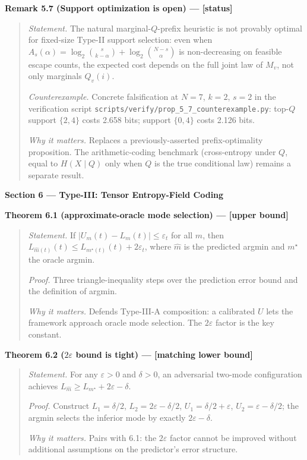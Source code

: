 \documentclass[
]{article}
\begin{document}
\textbf{Remark 5.7 (Support optimization is open) --- {[}status{]}}

\begin{quote}
\emph{Statement.} The natural marginal-$Q$-prefix heuristic is not
provably optimal for fixed-size Type-II support selection: even when
$A_s(\alpha) = \log_2 \binom{s}{k - \alpha} + \log_2 \binom{N - s}{\alpha}$
is non-decreasing on feasible escape counts, the expected cost depends
on the full joint law of $M_v$, not only marginals $Q_v(i)$.

\emph{Counterexample.} Concrete falsification at $N = 7$, $k = 2$,
$s = 2$ in the verification script
\texttt{scripts/verify/prop\_5\_7\_counterexample.py}: top-$Q$ support
$\{2,4\}$ costs 2.658 bits; support $\{0,4\}$ costs 2.126 bits.

\emph{Why it matters.} Replaces a previously-asserted prefix-optimality
proposition. The arithmetic-coding benchmark (cross-entropy under $Q$,
equal to $H(X \mid Q)$ only when $Q$ is the true conditional law)
remains a separate result.
\end{quote}

\textbf{Section 6 --- Type-III: Tensor Entropy-Field Coding}

\textbf{Theorem 6.1 (approximate-oracle mode selection) --- {[}upper
bound{]}}

\begin{quote}
\emph{Statement.} If $|U_m(t) - L_m(t)| \leq \varepsilon_t$ for all
$m$, then $L_{\hat{m}(t)}(t) \leq L_{m^\star(t)}(t) + 2\varepsilon_t$,
where $\hat{m}$ is the predicted argmin and $m^\star$ the oracle
argmin.

\emph{Proof.} Three triangle-inequality steps over the prediction
error bound and the definition of argmin.

\emph{Why it matters.} Defends Type-III-A composition: a calibrated
$U$ lets the framework approach oracle mode selection. The
$2\varepsilon$ factor is the key constant.
\end{quote}

\textbf{Theorem 6.2 ($2\varepsilon$ bound is tight) ---
{[}matching lower bound{]}}

\begin{quote}
\emph{Statement.} For any $\varepsilon > 0$ and $\delta > 0$, an
adversarial two-mode configuration achieves
$L_{\hat{m}} \geq L_{m^\star} + 2\varepsilon - \delta$.

\emph{Proof.} Construct $L_1 = \delta/2$,
$L_2 = 2\varepsilon - \delta/2$, $U_1 = \delta/2 + \varepsilon$,
$U_2 = \varepsilon - \delta/2$; the argmin selects the inferior
mode by exactly $2\varepsilon - \delta$.

\emph{Why it matters.} Pairs with 6.1: the $2\varepsilon$ factor
cannot be improved without additional assumptions on the predictor's
error structure.
\end{quote}
\end{document}
